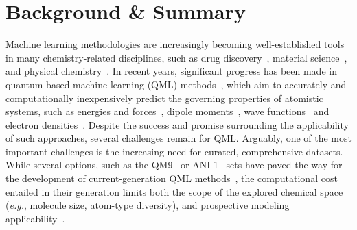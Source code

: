 \section*{Background \& Summary}

Machine learning methodologies are increasingly becoming well-established tools in many chemistry-related disciplines, such as drug discovery~\cite{gawehn2016deep}, material science~\cite{schmidt2019recent}, and physical chemistry~\cite{von2018quantum}. In recent years, significant progress has been made in quantum-based machine learning (QML) methods~\cite{von2020exploring}, which aim to accurately and computationally inexpensively predict the governing properties of atomistic systems, such as energies and forces~\cite{satorras2021n, schutt2021equivariant, huang2020quantum, christensen2020fchl, heinen2020quantum, heinen2020machine, christensen2019operators, faber2018alchemical}, dipole moments~\cite{balcells2020tmqm}, wave functions~\cite{unke2021se3equivariant, schutt2019unifying} and electron densities~\cite{grisafi2018transferable, fabrizio2019electron}. Despite the success and promise surrounding the applicability of such approaches, several challenges remain for QML. Arguably, one of the most important challenges is the increasing need for curated, comprehensive datasets.~\cite{balcells2020tmqm} While several options, such as the QM9~\cite{ramakrishnan2014quantum} or ANI-1~\cite{smith2017anid} sets have paved the way for the development of current-generation QML methods~\cite{satorras2021n, schutt2021equivariant, huang2020quantum, christensen2020fchl, smith2017ani, smith2020ani, nakata2020pubchemqc}, the computational cost entailed in their generation limits both the scope of the explored chemical space (\textit{e.g.}, molecule size, atom-type diversity), and prospective modeling applicability~\cite{balcells2020tmqm, glavatskikh2019dataset}. 

